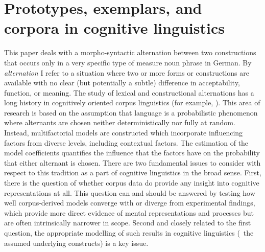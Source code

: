 \section{Prototypes, exemplars, and corpora in cognitive linguistics}
\label{sec:cogocl}

This paper deals with a morpho-syntactic alternation between two constructions that occurs only in a very specific type of measure noun phrase in German.
By \textit{alternation} I refer to a situation where two or more forms or constructions are available with no clear (but potentially a subtle) difference in acceptability, function, or meaning.
The study of lexical and constructional alternations has a long history in cognitively oriented corpus linguistics (for example, \citealp{BresnanEa2007,BresnanHay2010,BresnanFord2010,DivjakArppe2013,Gries2015,NessetJanda2010,Wulff2003}).
This area of research is based on the assumption that language is a probabilistic phenomenon \citep{Bresnan2007} where alternants are chosen neither deterministically nor fully at random.
Instead, multifactorial models are constructed which incorporate influencing factors from diverse levels, including contextual factors.
The estimation of the model coefficients quantifies the influence that the factors have on the probability that either alternant is chosen.
There are two fundamental issues to consider with respect to this tradition as a part of cognitive linguistics in the broad sense.
First, there is the question of whether corpus data do provide any insight into cognitive representations at all.
This question can and should be answered by testing how well corpus-derived models converge with or diverge from experimental findings, which provide more direct evidence of mental representations and processes but are often intrinsically narrower in scope.
Second and closely related to the first question, the appropriate modelling of such results in cognitive linguistics (\ie\ the assumed underlying constructs) is a key issue.

